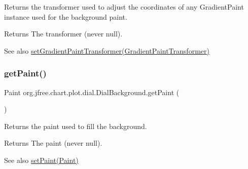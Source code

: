 Returns the transformer used to adjust the coordinates of any {\ttfamily Gradient\+Paint} instance used for the background paint.

\begin{DoxyReturn}{Returns}
The transformer (never {\ttfamily null}).
\end{DoxyReturn}
\begin{DoxySeeAlso}{See also}
\mbox{\hyperlink{classorg_1_1jfree_1_1chart_1_1plot_1_1dial_1_1_dial_background_a908b45fd3e17a9ed6f681e5083410371}{set\+Gradient\+Paint\+Transformer(\+Gradient\+Paint\+Transformer)}} 
\end{DoxySeeAlso}
\mbox{\label{classorg_1_1jfree_1_1chart_1_1plot_1_1dial_1_1_dial_background_a3ec700ecf1d9518ea4f6ae98bf8d97aa}} 
\subsubsection{\texorpdfstring{get\+Paint()}{getPaint()}}
{\footnotesize\ttfamily Paint org.\+jfree.\+chart.\+plot.\+dial.\+Dial\+Background.\+get\+Paint (\begin{DoxyParamCaption}{ }\end{DoxyParamCaption})}

Returns the paint used to fill the background.

\begin{DoxyReturn}{Returns}
The paint (never {\ttfamily null}).
\end{DoxyReturn}
\begin{DoxySeeAlso}{See also}
\mbox{\hyperlink{classorg_1_1jfree_1_1chart_1_1plot_1_1dial_1_1_dial_background_a1fd67d534fd46234b811a2707977a690}{set\+Paint(\+Paint)}} 
\end{DoxySeeAlso}
\mbox{\label{classorg_1_1jfree_1_1chart_1_1plot_1_1dial_1_1_dial_background_ad2e6dff5ca7da7dc2b2c30f8fc896209}} 
